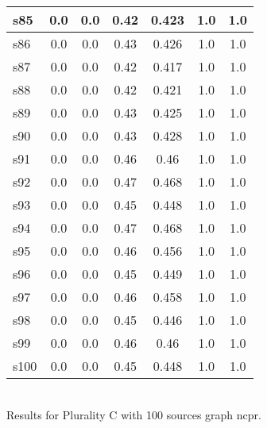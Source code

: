 \documentclass{article}
\begin{document}
\begin{tabular}{|l|c|c|c|c|c|c|}
\hline
s85 &0.0 & 0.0 & 0.42 & 0.423 & 1.0 & 1.0\\
\hline
s86 &0.0 & 0.0 & 0.43 & 0.426 & 1.0 & 1.0\\
\hline
s87 &0.0 & 0.0 & 0.42 & 0.417 & 1.0 & 1.0\\
\hline
s88 &0.0 & 0.0 & 0.42 & 0.421 & 1.0 & 1.0\\
\hline
s89 &0.0 & 0.0 & 0.43 & 0.425 & 1.0 & 1.0\\
\hline
s90 &0.0 & 0.0 & 0.43 & 0.428 & 1.0 & 1.0\\
\hline
s91 &0.0 & 0.0 & 0.46 & 0.46 & 1.0 & 1.0\\
\hline
s92 &0.0 & 0.0 & 0.47 & 0.468 & 1.0 & 1.0\\
\hline
s93 &0.0 & 0.0 & 0.45 & 0.448 & 1.0 & 1.0\\
\hline
s94 &0.0 & 0.0 & 0.47 & 0.468 & 1.0 & 1.0\\
\hline
s95 &0.0 & 0.0 & 0.46 & 0.456 & 1.0 & 1.0\\
\hline
s96 &0.0 & 0.0 & 0.45 & 0.449 & 1.0 & 1.0\\
\hline
s97 &0.0 & 0.0 & 0.46 & 0.458 & 1.0 & 1.0\\
\hline
s98 &0.0 & 0.0 & 0.45 & 0.446 & 1.0 & 1.0\\
\hline
s99 &0.0 & 0.0 & 0.46 & 0.46 & 1.0 & 1.0\\
\hline
s100 &0.0 & 0.0 & 0.45 & 0.448 & 1.0 & 1.0\\
\hline
\end{tabular}\\

\noindent Results for Plurality C with 100 sources graph ncpr.
\end{document}
